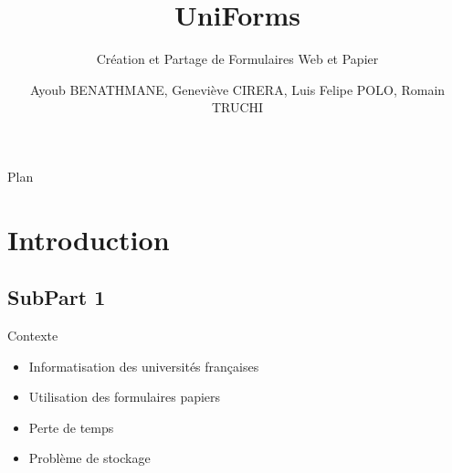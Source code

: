 \documentclass[11pt]{beamer}
\title{UniForms}
\author[Ayoub BENATHMANE, Geneviève CIRERA, Luis Felipe POLO, Romain TRUCHI]{Ayoub BENATHMANE, Geneviève CIRERA, Luis Felipe POLO, Romain TRUCHI\\\vspace{1cm}{\small Encadrant : Michel GAUTERO}}
\institute{Polytech'Nice-Sophia}
\subtitle{Création et Partage de Formulaires 
Web et Papier}
\date{\oldstylenums{\today}}
\begin{document}
\begin{frame}
\titlepage
\end{frame}

\begin{frame}{Plan}
  \tableofcontents[sections={1}]
  \tableofcontents[sections={2}]
  \tableofcontents[sections={3}]
  \tableofcontents[sections={4}]
\end{frame}


\section{Introduction}
\subsection*{SubPart 1}
\begin{frame}{Contexte}
	\begin{itemize}
		\item Informatisation des universités françaises
		\item Utilisation des formulaires papiers
  		\item Perte de temps
  		\item Problème de stockage
  	\end{itemize}
\end{frame}
\end{document}
